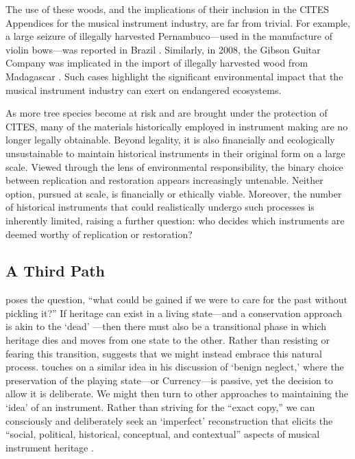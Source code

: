 The use of these woods, and the implications of their inclusion in the CITES
Appendices for the musical instrument industry, are far from trivial. For
example, a large seizure of illegally harvested Pernambuco---used in the
manufacture of violin bows---was reported in Brazil \cite{toledo_operation_2022}.
Similarly, in 2008, the Gibson Guitar Company was implicated in the import of
illegally harvested wood from Madagascar \cite{justice_gibson_2012}. Such cases
highlight the significant environmental impact that the musical instrument
industry can exert on endangered ecosystems.

As more tree species become at risk and are brought under the protection of
CITES, many of the materials historically employed in instrument making are no
longer legally obtainable. Beyond legality, it is also financially and
ecologically unsustainable to maintain historical instruments in their original
form on a large scale. Viewed through the lens of environmental responsibility,
the binary choice between replication and restoration appears increasingly
untenable. Neither option, pursued at scale, is financially or ethically viable.
Moreover, the number of historical instruments that could realistically undergo
such processes is inherently limited, raising a further question: who decides
which instruments are deemed worthy of replication or restoration?


\subsection{A Third Path}\label{sec:third-path}

\textcite{desilvey_curated_2017} poses the question, ``what could be gained if
we were to care for the past without pickling it?'' If heritage can exist in a
living state---and a conservation approach is akin to the `dead'
\cite{poulios_moving_2010}---then there must also be a transitional phase in which
heritage dies and moves from one state to the other. Rather than resisting or
fearing this transition, \textcite{desilvey_curated_2017} suggests that we might
instead embrace this natural process.
\textcite[p.\ 75]{barclay_preservation_2005} touches on a similar idea in his
discussion of `benign neglect,' where the preservation of the playing state---or
Currency---is passive, yet the decision to allow it is deliberate. We might then
turn to other approaches to maintaining the `idea' of an instrument. Rather than
striving for the ``exact copy,'' we can consciously and deliberately seek an
`imperfect' reconstruction that elicits the ``social, political, historical,
conceptual, and contextual'' aspects of musical instrument heritage
\cite{holzer_imperfect_2025}.

